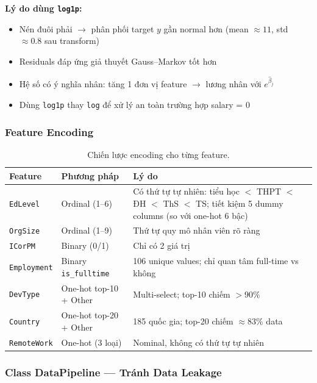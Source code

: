 \noindent\textbf{Lý do dùng \texttt{log1p}:}
\begin{itemize}
    \item Nén đuôi phải $\to$ phân phối target $y$ gần normal hơn
        (mean $\approx 11$, std $\approx 0.8$ sau transform)
    \item Residuals đáp ứng giả thuyết Gauss--Markov tốt hơn
    \item Hệ số có ý nghĩa nhân: tăng 1 đơn vị feature $\to$ lương nhân với
        $e^{\hat{\beta}_j}$
    \item Dùng \texttt{log1p} thay \texttt{log} để xử lý an toàn trường hợp salary = 0
\end{itemize}

\subsubsection{Feature Encoding}

\begin{table}[H]
\centering
\begin{tabular}{llp{7.5cm}}
\toprule
\textbf{Feature} & \textbf{Phương pháp} & \textbf{Lý do} \\
\midrule
\texttt{EdLevel} & Ordinal (1--6) & Có thứ tự tự nhiên: tiểu học $<$ THPT $<$ ĐH $<$ ThS $<$ TS; tiết kiệm 5 dummy columns (so với one-hot 6 bậc) \\
\texttt{OrgSize} & Ordinal (1--9) & Thứ tự quy mô nhân viên rõ ràng \\
\texttt{ICorPM} & Binary (0/1) & Chỉ có 2 giá trị \\
\texttt{Employment} & Binary \texttt{is\_fulltime} & 106 unique values; chỉ quan tâm full-time vs không \\
\texttt{DevType} & One-hot top-10 + Other & Multi-select; top-10 chiếm $> 90\%$ \\
\texttt{Country} & One-hot top-20 + Other & 185 quốc gia; top-20 chiếm $\approx 83\%$ data \\
\texttt{RemoteWork} & One-hot (3 loại) & Nominal, không có thứ tự tự nhiên \\
\bottomrule
\end{tabular}
\caption{Chiến lược encoding cho từng feature.}
\end{table}

\subsubsection{Class DataPipeline — Tránh Data Leakage}

